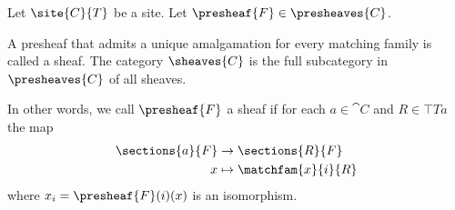 \begin{definition}[Sheaves]
Let $\site{C}{T}$ be a site. 
Let $\presheaf{F} \in \presheaves{C}$.

A presheaf that admits a unique amalgamation for every matching family is called a sheaf.
The category $\sheaves{C}$ is the full subcategory in $\presheaves{C}$ of all sheaves.

In other words, 
we call $\presheaf{F}$ a sheaf 
if for each $a \in \cat{C}$ 
and $R\in \top{T}{a}$ 
the map 
\begin{align*}
	\sections{a}{F} 	& \rightarrow \sections{R}{F}\\
	x 					& \mapsto \matchfam{x}{i}{R}
\end{align*}
where $x_i = \presheaf{F}(i)(x)$
is an isomorphism.
\end{definition}